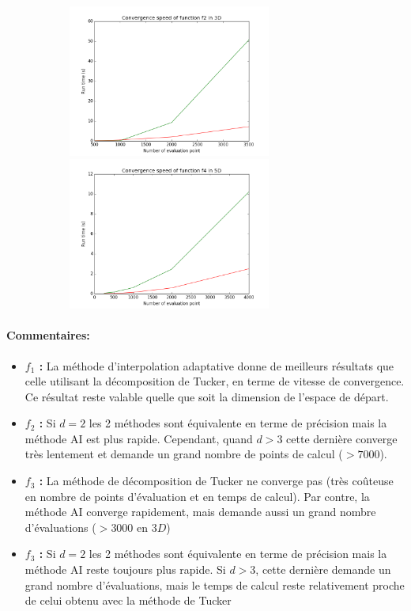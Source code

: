 \begin{center}
\begin{figure}[!h]
		~
		\begin{subfigure}[b]{0.3\textwidth}
				\includegraphics[width=\linewidth,height=5cm]{images/f2_3d_s.png}
				\includegraphics[width=\linewidth,height=5cm]{images/f4_5d_s.png}
		\end{subfigure}
		\label{figure:runtime}
\end{figure}
\label{figure:runtime}
\end{center}

\newpage

\paragraph{Commentaires:}
\begin{itemize}
	\item \textbf{$f_1$ :} La méthode d'interpolation adaptative donne de meilleurs résultats que celle utilisant la décomposition de Tucker, en terme de vitesse de convergence. Ce résultat reste valable quelle que soit la dimension de l'espace de départ.
	\item \textbf{$f_2$ :} Si $d=2$ les 2 méthodes sont équivalente en terme de précision mais la méthode AI est plus rapide. Cependant, quand $d>3$ cette dernière converge très lentement et demande un grand nombre de points de calcul ($>7000$).
	\item \textbf{$f_3$ :} La méthode de décomposition de Tucker ne converge pas (très coûteuse en nombre de points d'évaluation et en temps de calcul). Par contre, la méthode AI converge rapidement, mais demande aussi un grand nombre d’évaluations ($>3000$ en $3D$)
	\item \textbf{$f_3$ :} Si $d=2$ les 2 méthodes sont équivalente en terme de précision mais la méthode AI reste toujours plus rapide. Si $d>3$, cette dernière demande un grand nombre d’évaluations, mais le temps de calcul reste relativement proche de celui obtenu avec la méthode de Tucker
\end{itemize}
